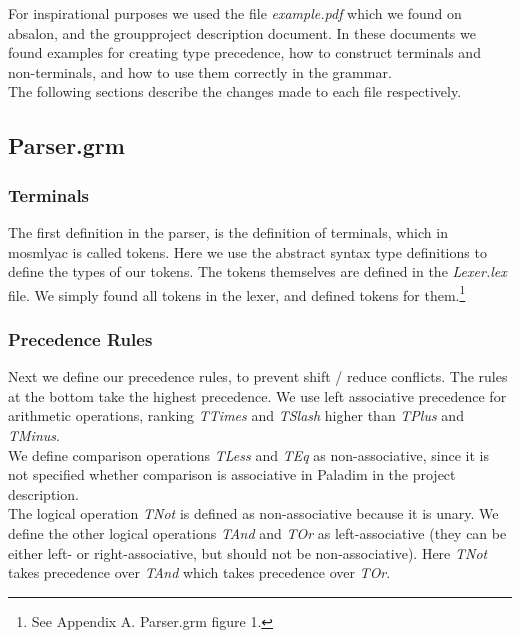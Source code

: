\documentclass[12pt,a4paper,english]{article}
\begin{document}
For inspirational purposes we used the file \textit{example.pdf} which we found on absalon, and the groupproject description document. In these documents we found examples for creating type precedence, how to construct terminals and non-terminals, and how to use them correctly in the grammar.  \\

The following sections describe the changes made to each file respectively.
\subsection{Parser.grm}
\subsubsection{Terminals}
The first definition in the parser, is the definition of terminals, which in mosmlyac is called tokens.
Here we use the abstract syntax type definitions to define the types of our tokens. The tokens themselves are defined in the \textit{Lexer.lex} file. We simply found all tokens in the lexer, and defined tokens for them.\footnote{See Appendix A. Parser.grm figure 1.}

\subsubsection{Precedence Rules}

Next we define our precedence rules, to prevent shift / reduce conflicts. The rules at the bottom take the highest precedence.
We use left associative precedence for arithmetic operations, ranking \textit{TTimes} and \textit{TSlash} higher than \textit{TPlus} and \textit{TMinus}. \\

We define comparison operations \textit{TLess} and \textit{TEq} as non-associative, since it is not specified whether comparison is associative in Paladim in the project description. \\

The logical operation \textit{TNot} is defined as non-associative because it is unary. We define the other logical operations \textit{TAnd} and \textit{TOr} as left-associative (they can be either left- or right-associative, but should not be non-associative). Here \textit{TNot} takes precedence over \textit{TAnd} which takes precedence over \textit{TOr}. \\
\end{document}
